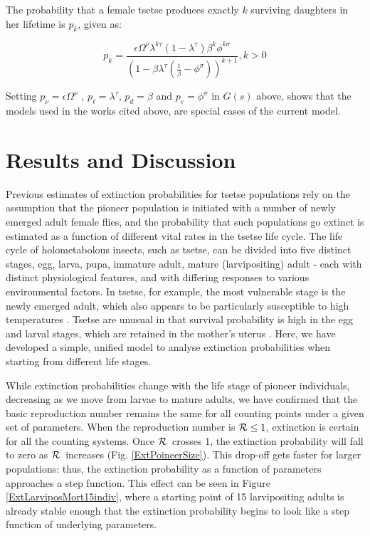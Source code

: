 \documentclass[smallextended]{svjour3}
\newcommand{\Rx}{\ensuremath{\cal R}}
\begin{document}
	The probability that a female tsetse produces exactly $k$ surviving daughters in her lifetime is $p_{k}$, given as:
	
	\begin{equation}
		\label{Johnframework}
		p_{k}= \frac{\epsilon \Omega^{\nu}\lambda^{k\tau}(1-\lambda^{\tau})\beta^{k}\phi^{k\sigma}}{(1-\beta \lambda^\tau(\frac{1}{\beta} -\phi^{\sigma}))^{k+1}},   k>0   
	\end{equation}
	
	Setting  $ p_{\nu}= \epsilon \Omega^{\nu}$ , $p_{\ell} =\lambda^{\tau} $, $p_{d}=\beta$  and $p_{e} = \phi^{\sigma} $ in  $G(s)$ above,   shows that the models used in the works cited above, are special cases of the current model. 
	
	\section{Results and Discussion}
	\label{section8}
	
	Previous estimates of extinction probabilities for tsetse populations rely on the assumption that the pioneer population is initiated with a number of newly emerged adult female flies, and the probability that such populations go extinct is estimated as a function of different vital rates in the tsetse life cycle. The life cycle of holometabolous insects, such as tsetse, can be divided into five distinct stages, egg, larva, pupa, immature adult, mature (larvipositing) adult - each with distinct physiological features, and with differing responses to various environmental factors. In tsetse, for example, the most vulnerable stage is the newly emerged adult, which also appears to be particularly susceptible to high temperatures \cite{Ackley2017a}. Tsetse are unusual in that survival probability is high in the egg and larval stages, which are retained in the mother's uterus \cite{Hargrove1999a}. Here, we have developed a simple, unified model to analyse extinction probabilities when starting from different life stages. 
	
	
	While extinction probabilities change with the life stage of pioneer individuals, decreasing as we move from larvae to mature adults,  we have confirmed that the basic reproduction number remains the same for all counting points under a given set of parameters. When the reproduction number is ${\cal R} \leq 1$, extinction is certain for all the counting systems. Once \Rx\ crosses 1, the extinction probability will fall to zero as \Rx\ increases (Fig. \ref{ExtPoineerSize}). This drop-off gets faster for larger populations: thus, the extinction probability as a function of parameters approaches a step function. This effect can be seen in Figure \ref{ExtLarviposMort15indiv}, where a starting point of 15 larvipositing adults is already stable enough that the extinction probability begins to look like a step function of underlying parameters.
	
\end{document}
